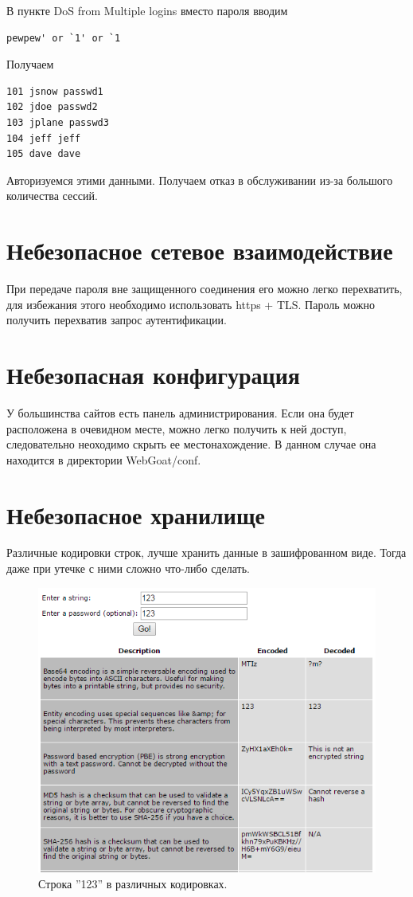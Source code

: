 \documentclass[utf8x, 12pt]{G7-32}
\begin{document}
В пункте DoS from Multiple logins вместо пароля вводим
\begin{lstlisting}
pewpew' or `1' or `1
\end{lstlisting}
Получаем
\begin{lstlisting}
101 jsnow passwd1
102 jdoe passwd2
103 jplane passwd3
104 jeff jeff
105 dave dave
\end{lstlisting}
Авторизуемся этими данными. Получаем отказ в обслуживании из-за большого количества сессий.

\section{Небезопасное сетевое взаимодействие}
При передаче пароля вне защищенного соединения его можно легко перехватить, для избежания этого необходимо использовать https + TLS. Пароль можно получить перехватив запрос аутентификации.

\section{Небезопасная конфигурация}
У большинства сайтов есть панель администрирования. Если она будет расположена в очевидном месте, можно легко получить к ней доступ, следовательно неоходимо скрыть ее местонахождение. В данном случае она находится в директории WebGoat/conf.


\section{Небезопасное хранилище}
Различные кодировки строк, лучше хранить данные в зашифрованном виде. Тогда даже при утечке с ними сложно что-либо сделать.
\begin{figure}[h!]
\centering
\includegraphics[width=\textwidth]{rsrc/8_1}
\caption{Строка ''123'' в различных кодировках.}
\end{figure}
\end{document}
